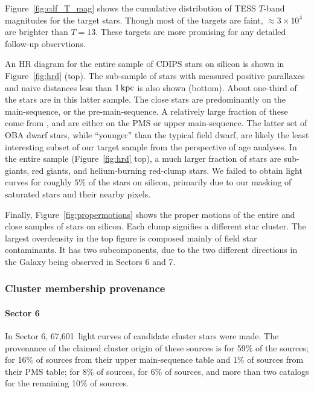 \documentclass[12pt,twocolumn,tighten]{aastex62}
\newcommand{\sVInumberlcs}{67{,}601\ }  %
\begin{document}
Figure~\ref{fig:cdf_T_mag} shows the cumulative distribution of TESS
$T$-band magnitudes for the target stars.  Though most of the targets
are faint, $\approx3\times10^4$ are brighter than $T=13$. These
targets are more promising for any detailed follow-up observtions.

An HR diagram for the entire sample of CDIPS stars on silicon is shown
in Figure~\ref{fig:hrd} (top).  The sub-sample of stars with measured
positive parallaxes and naive distances less than $1\,{\rm kpc}$ is
also shown (bottom).  About one-third of the stars are in this latter
sample.  The close stars are predominantly on the main-sequence, or
the pre-main-sequence.  A relatively large fraction of these come from
\citet{zari_3d_2018}, and are either on the PMS or upper
main-sequence.  The latter set of OBA dwarf stars, while ``younger''
than the typical field dwarf, are likely the least interesting subset
of our target sample from the perspective of age analyses.  In the
entire sample (Figure~\ref{fig:hrd} top), a much larger fraction of
stars are sub-giants, red giants, and helium-burning red-clump stars.
We failed to obtain light curves for roughly $5\%$ of the stars on
silicon, primarily due to our masking of saturated stars and their
nearby pixels.

Finally, Figure~\ref{fig:propermotions} shows the proper motions of
the entire and close samples of stars on silicon.  Each clump
signifies a different star cluster. The largest overdensity in the top
figure is composed mainly of field star contaminants. It has two
subcomponents, due to the two different directions in the Galaxy being
observed in Sectors 6 and 7.



\subsubsection{Cluster membership provenance}

\paragraph{Sector 6}
In Sector 6, \sVInumberlcs light curves of candidate cluster stars
were made. The provenance of the claimed cluster origin of these
sources is \citet{dias_proper_2014} for 59\% of the sources;
\citet{zari_3d_2018} for 16\% of sources from their upper
main-sequence table and 1\% of sources from their PMS table;
\citet{Kharchenko_et_al_2013} for 8\% of sources,
\citet{cantat-gaudin_gaia_2018} for 6\% of sources, and more than two
catalogs for the remaining 10\% of sources.
\end{document}
